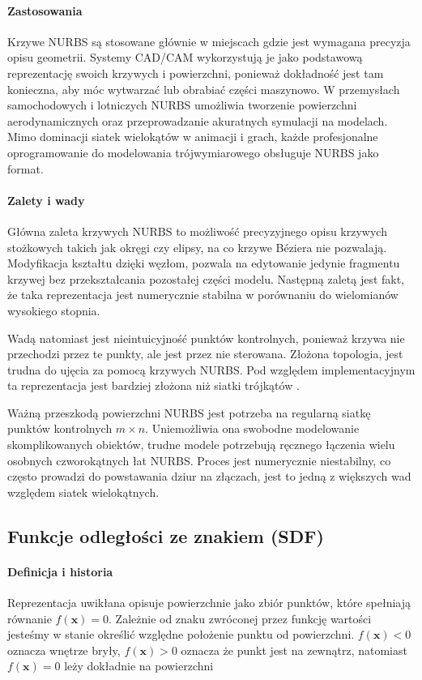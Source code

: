 \paragraph{Zastosowania}
Krzywe NURBS są stosowane głównie w miejscach gdzie jest wymagana precyzja opisu geometrii. Systemy CAD/CAM wykorzystują je jako podstawową reprezentację swoich krzywych i powierzchni, ponieważ dokładność jest tam konieczna, aby móc wytwarzać lub obrabiać części maszynowo. W przemysłach samochodowych i lotniczych NURBS umożliwia tworzenie powierzchni aerodynamicznych oraz przeprowadzanie akuratnych symulacji na modelach. Mimo dominacji siatek wielokątów w animacji i grach, każde profesjonalne oprogramowanie do modelowania trójwymiarowego obsługuje NURBS jako format.

\paragraph{Zalety i wady}
Główna zaleta krzywych NURBS to możliwość precyzyjnego opisu krzywych stożkowych takich jak okręgi czy elipsy, na co krzywe Béziera nie pozwalają. Modyfikacja kształtu dzięki węzłom, pozwala na edytowanie jedynie fragmentu krzywej bez przekształcania pozostałej części modelu. Następną zaletą jest fakt, że taka reprezentacja jest numerycznie stabilna w porównaniu do wielomianów wysokiego stopnia. 

Wadą natomiast jest nieintuicyjność punktów kontrolnych, ponieważ krzywa nie przechodzi przez te punkty, ale jest przez nie sterowana. Złożona topologia, jest trudna do ujęcia za pomocą krzywych NURBS. Pod względem implementacyjnym ta reprezentacja jest bardziej złożona niż siatki trójkątów \cite{piegl1997}.

Ważną przeszkodą powierzchni NURBS jest potrzeba na regularną siatkę punktów kontrolnych $m \times n$. Uniemożliwia ona swobodne modelowanie skomplikowanych obiektów, trudne modele potrzebują ręcznego łączenia wielu osobnych czworokątnych łat NURBS. Proces jest numerycznie niestabilny, co często prowadzi do powstawania dziur na złączach, jest to jedną z większych wad względem siatek wielokątnych.

\subsection{Funkcje odległości ze znakiem (SDF)}
\label{sec:sdf}

\paragraph{Definicja i historia}
Reprezentacja uwikłana opisuje powierzchnie jako zbiór punktów, które spełniają równanie $f(\mathbf{x}) = 0$. Zależnie od znaku zwróconej przez funkcję wartości jesteśmy w stanie określić względne położenie punktu od powierzchni. $f(\mathbf{x}) < 0$ oznacza wnętrze bryły, $f(\mathbf{x}) > 0$ oznacza że punkt jest na zewnątrz, natomiast $f(\mathbf{x}) = 0$ leży dokładnie na powierzchni \cite{osher2003}

